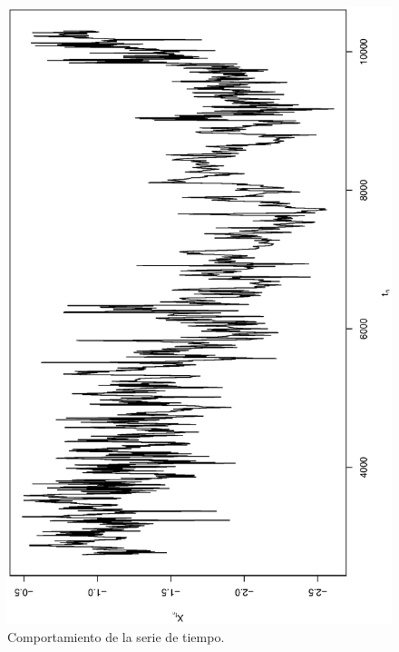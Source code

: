 \begin{figure}[h]
    \begin{minipage}{0.45\textwidth}
    \includegraphics[width=0.8\linewidth,angle = 270]{Kap3/Fig_Cap3/example_data_original.eps}
    \caption{Comportamiento de la serie de tiempo.}
    \label{fig:example}
    \end{minipage}
    \hfill
    \begin{minipage}{0.45\textwidth}

\end{minipage}
\end{figure}
